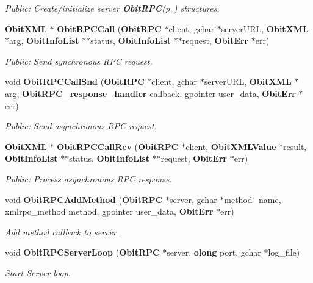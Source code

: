 \begin{CompactItemize}
\begin{CompactList}\small\item\em Public: Create/initialize server {\bf Obit\-RPC}{\rm (p.\,\pageref{structObitRPC})} structures. \item\end{CompactList}\item 
{\bf Obit\-XML} $\ast$ {\bf Obit\-RPCCall} ({\bf Obit\-RPC} $\ast$client, gchar $\ast$server\-URL, {\bf Obit\-XML} $\ast$arg, {\bf Obit\-Info\-List} $\ast$$\ast$status, {\bf Obit\-Info\-List} $\ast$$\ast$request, {\bf Obit\-Err} $\ast$err)
\begin{CompactList}\small\item\em Public: Send synchronous RPC request. \item\end{CompactList}\item 
void {\bf Obit\-RPCCall\-Snd} ({\bf Obit\-RPC} $\ast$client, gchar $\ast$server\-URL, {\bf Obit\-XML} $\ast$arg, {\bf Obit\-RPC\_\-response\_\-handler} callback, gpointer user\_\-data, {\bf Obit\-Err} $\ast$err)
\begin{CompactList}\small\item\em Public: Send asynchronous RPC request. \item\end{CompactList}\item 
{\bf Obit\-XML} $\ast$ {\bf Obit\-RPCCall\-Rcv} ({\bf Obit\-RPC} $\ast$client, {\bf Obit\-XMLValue} $\ast$result, {\bf Obit\-Info\-List} $\ast$$\ast$status, {\bf Obit\-Info\-List} $\ast$$\ast$request, {\bf Obit\-Err} $\ast$err)
\begin{CompactList}\small\item\em Public: Process asynchronous RPC response. \item\end{CompactList}\item 
void {\bf Obit\-RPCAdd\-Method} ({\bf Obit\-RPC} $\ast$server, gchar $\ast$method\_\-name, xmlrpc\_\-method method, gpointer user\_\-data, {\bf Obit\-Err} $\ast$err)
\begin{CompactList}\small\item\em Add method callback to server. \item\end{CompactList}\item 
void {\bf Obit\-RPCServer\-Loop} ({\bf Obit\-RPC} $\ast$server, {\bf olong} port, gchar $\ast$log\_\-file)
\begin{CompactList}\small\item\em Start Server loop. \item\end{CompactList}\item 

\end{CompactItemize}
